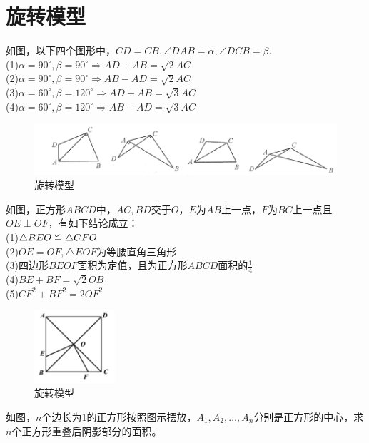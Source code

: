 \documentclass{ecnuthesis}
\newcommand\backcong{\mathrel{\reflectbox{$\cong$}}}
\begin{document}
\section{旋转模型}
\begin{model}
    如图，以下四个图形中，$CD=CB,\angle DAB=\alpha,\angle DCB=\beta$.\\
    (1)$\alpha=90^\circ,\beta=90^\circ\Rightarrow AD+AB=\sqrt2 AC$ \\
    (2)$\alpha=90^\circ,\beta=90^\circ\Rightarrow AB-AD=\sqrt2 AC$ \\
    (3)$\alpha=60^\circ,\beta=120^\circ\Rightarrow AD+AB=\sqrt3 AC$ \\
    (4)$\alpha=60^\circ,\beta=120^\circ\Rightarrow AB-AD=\sqrt3 AC$ \\
\end{model}
\begin{figure}[H]
\centering
\includegraphics[width=12cm]{picture/6108.png}
\caption{旋转模型}
\end{figure}
\begin{model}
    如图，正方形$ABCD$中，$AC,BD$交于$O$，$E$为$AB$上一点，$F$为$BC$上一点且$OE\perp OF$，有如下结论成立：\\
    (1)$\triangle BEO \backcong \triangle CFO$ \\
    (2)$OE=OF,\triangle EOF$为等腰直角三角形 \\
    (3)四边形$BEOF$面积为定值，且为正方形$ABCD$面积的$\frac{1}{4}$ \\
    (4)$BE+BF=\sqrt2 OB$ \\
    (5)$CF^2+BF^2=2OF^2$ \\
\end{model}
\begin{figure}[H]
\centering
\includegraphics[width=3cm]{picture/6109.png}
\caption{旋转模型}
\end{figure}
\begin{problem}
    如图，$n$个边长为1的正方形按照图示摆放，$A_1,A_2,…,A_n$分别是正方形的中心，求$n$个正方形重叠后阴影部分的面积。
\end{problem}
\end{document}
